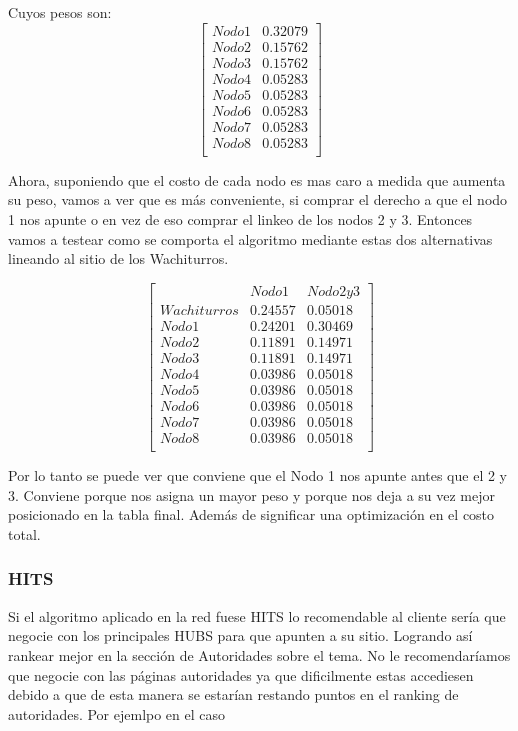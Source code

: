 Cuyos pesos son:
   $$ 
\begin{bmatrix}
Nodo 1 & 0.32079\\
Nodo 2 & 0.15762\\
Nodo 3 & 0.15762\\
Nodo 4 & 0.05283\\
Nodo 5 & 0.05283\\
Nodo 6 & 0.05283\\
Nodo 7 & 0.05283\\
Nodo 8 & 0.05283\\
\end{bmatrix} 
$$

Ahora, suponiendo que el costo de cada nodo es mas caro a medida que aumenta su peso, vamos a ver que es más conveniente, si comprar el derecho a que el nodo 1 nos apunte o en vez de eso comprar el linkeo de los nodos 2 y 3. Entonces vamos a testear como se comporta el algoritmo mediante estas dos alternativas lineando al sitio de los Wachiturros.


   $$ 
\begin{bmatrix}
 & Nodo 1 & Nodo 2 y 3 \\
Wachiturros & 0.24557  & 0.05018   \\
Nodo 1 & 0.24201& 0.30469\\
Nodo 2 & 0.11891& 0.14971\\
Nodo 3 & 0.11891& 0.14971\\
Nodo 4 & 0.03986  & 0.05018\\
Nodo 5 & 0.03986  & 0.05018\\
Nodo 6 & 0.03986  & 0.05018\\
Nodo 7 & 0.03986 & 0.05018\\
Nodo 8 & 0.03986 & 0.05018\\
\end{bmatrix} 
$$

Por lo tanto se puede ver que conviene que el Nodo 1 nos apunte antes que el 2 y 3. Conviene porque nos asigna un mayor peso y porque nos deja a su vez mejor posicionado en la tabla final. Además de significar una optimización en el costo total.

\subsubsection{HITS}
Si el algoritmo aplicado en la red fuese HITS lo recomendable al cliente sería que negocie con los principales HUBS para que apunten a su sitio. Logrando así rankear mejor en la sección de Autoridades sobre el tema. 
No le recomendaríamos que negocie con las páginas autoridades ya que dificilmente estas accediesen debido a que de esta manera se estarían restando puntos en el ranking de autoridades. Por ejemlpo en el caso

